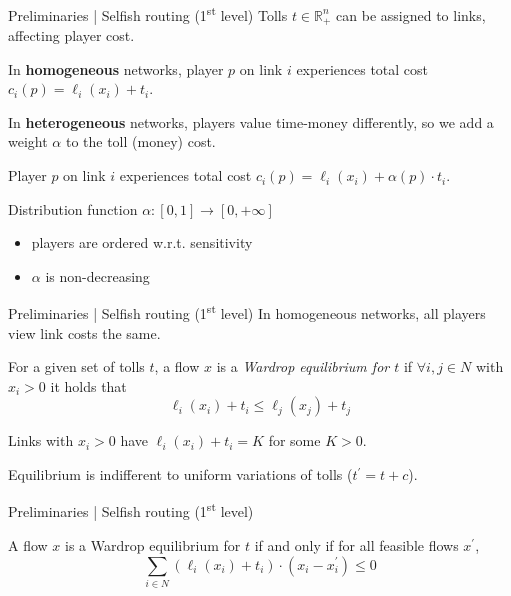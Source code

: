 \documentclass{beamer}
\newcommand{\R}{\mathbb{R}}
\begin{document}
\begin{frame}{Preliminaries | Selfish routing (1\textsuperscript{st} level)}
	Tolls $t \in \R_+^n$ can be assigned to links, affecting player cost.

	In \textbf{homogeneous} networks, player $p$ on link $i$ experiences total cost $c_i(p) = \ell_i(x_i) + t_i$.

	In \textbf{heterogeneous} networks, players value time-money differently, so we add a weight $\alpha$ to the toll (money) cost.

	Player $p$ on link $i$ experiences total cost $c_i(p) = \ell_i(x_i) + \alpha(p) \cdot t_i$.
	\begin{block}{Distribution function $\alpha: [0, 1] \rightarrow [0, +\infty]$}
		\begin{itemize}
			\item players are ordered w.r.t. sensitivity
			\item $\alpha$ is non-decreasing
		\end{itemize}
	\end{block}
\end{frame}

\begin{frame}{Preliminaries | Selfish routing (1\textsuperscript{st} level)}
	In homogeneous networks, all players view link costs the same.
	\begin{definition}
		For a given set of tolls $t$, a flow $x$ is a \textit{Wardrop equilibrium for $t$} if $\forall i, j \in N$ with $x_i > 0$ it holds that
		\begin{equation*}
			\ell_i(x_i) + t_i \leq \ell_j(x_j) + t_j
		\end{equation*}
	\end{definition}
	Links with $x_i > 0$ have $\ell_i(x_i) + t_i = K$ for some $K > 0$.

	Equilibrium is indifferent to uniform variations of tolls ($t^\prime = t + c$).
\end{frame}

\begin{frame}{Preliminaries | Selfish routing (1\textsuperscript{st} level)}
	\begin{lemma}
		A flow $x$ is a Wardrop equilibrium for $t$ if and only if for all feasible flows $x^\prime$,
		\[\sum_{i \in N} (\ell_i(x_i) + t_i) \cdot (x_i - x_i^\prime) \leq 0\]
	\end{lemma}
\end{frame}
\end{document}
